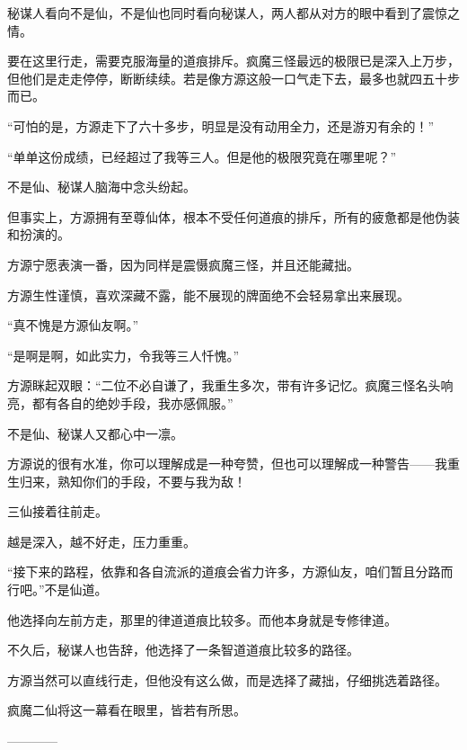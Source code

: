 \begin{this_body}
秘谋人看向不是仙，不是仙也同时看向秘谋人，两人都从对方的眼中看到了震惊之情。

要在这里行走，需要克服海量的道痕排斥。疯魔三怪最远的极限已是深入上万步，但他们是走走停停，断断续续。若是像方源这般一口气走下去，最多也就四五十步而已。

“可怕的是，方源走下了六十多步，明显是没有动用全力，还是游刃有余的！”

“单单这份成绩，已经超过了我等三人。但是他的极限究竟在哪里呢？”

不是仙、秘谋人脑海中念头纷起。

但事实上，方源拥有至尊仙体，根本不受任何道痕的排斥，所有的疲惫都是他伪装和扮演的。

方源宁愿表演一番，因为同样是震慑疯魔三怪，并且还能藏拙。

方源生性谨慎，喜欢深藏不露，能不展现的牌面绝不会轻易拿出来展现。

“真不愧是方源仙友啊。”

“是啊是啊，如此实力，令我等三人忏愧。”

方源眯起双眼：“二位不必自谦了，我重生多次，带有许多记忆。疯魔三怪名头响亮，都有各自的绝妙手段，我亦感佩服。”

不是仙、秘谋人又都心中一凛。

方源说的很有水准，你可以理解成是一种夸赞，但也可以理解成一种警告——我重生归来，熟知你们的手段，不要与我为敌！

三仙接着往前走。

越是深入，越不好走，压力重重。

“接下来的路程，依靠和各自流派的道痕会省力许多，方源仙友，咱们暂且分路而行吧。”不是仙道。

他选择向左前方走，那里的律道道痕比较多。而他本身就是专修律道。

不久后，秘谋人也告辞，他选择了一条智道道痕比较多的路径。

方源当然可以直线行走，但他没有这么做，而是选择了藏拙，仔细挑选着路径。

疯魔二仙将这一幕看在眼里，皆若有所思。

------------

\end{this_body}

